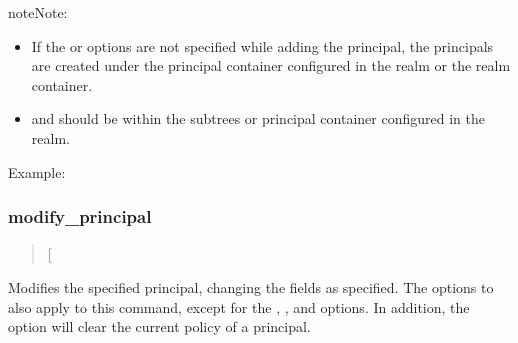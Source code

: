 \documentclass[letterpaper,10pt,english]{sphinxmanual}
\begin{document}
\begin{description}
\begin{sphinxadmonition}{note}{Note:}
\begin{itemize}
\item {} 
If the  or  options are not specified while
adding the principal, the principals are created under the
principal container configured in the realm or the realm
container.

\item {} 
 and  should be within the subtrees or
principal container configured in the realm.

\end{itemize}
\end{sphinxadmonition}

\end{description}

Example:

%
\begin{sphinxVerbatim}[commandchars=\\\{\}]
  
    
   
    
    
  
\end{sphinxVerbatim}


\subsubsection{modify\_principal}
\label{\detokenize{admin/admin_commands/kadmin_local:id2}}\label{\detokenize{admin/admin_commands/kadmin_local:modify-principal}}\begin{quote}

 {[}\sphinxstyleemphasis{options}{]} 
\end{quote}

Modifies the specified principal, changing the fields as specified.
The options to  also apply to this command, except
for the , , and  options.  In addition, the
option  will clear the current policy of a principal.
\end{document}
